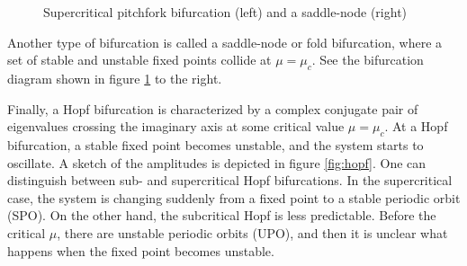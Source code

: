 \begin{figure}[ht]
\centering
\begin{subfigure}[t]{0.3\textwidth}
  \centering
\end{subfigure}
\hspace{0.1\textwidth}
\begin{subfigure}[t]{0.3\textwidth}
  \centering
\end{subfigure}
\caption{Supercritical pitchfork bifurcation (left) and a saddle-node (right)}
  \label{fig:pitch_saddle}
\end{figure}

Another type of bifurcation is called a saddle-node or fold bifurcation, where
a set of stable and unstable fixed points collide at $\mu = \mu_c$. See the
bifurcation diagram shown in figure \ref{fig:pitch_saddle} to the right.

Finally, a Hopf bifurcation is characterized by a complex conjugate pair of
eigenvalues crossing the imaginary axis at some critical value $\mu = \mu_c$.
At a Hopf bifurcation, a stable fixed point becomes unstable, and the system
starts to oscillate. A sketch of the amplitudes is depicted in figure
\ref{fig:hopf}. One can distinguish between sub- and supercritical Hopf
bifurcations. In the supercritical case, the system is changing suddenly from a
fixed point to a stable periodic orbit (SPO). On the other hand, the
subcritical Hopf is less predictable. Before the critical $\mu$, there are
unstable periodic orbits (UPO), and then it is unclear what happens when the
fixed point becomes unstable.

